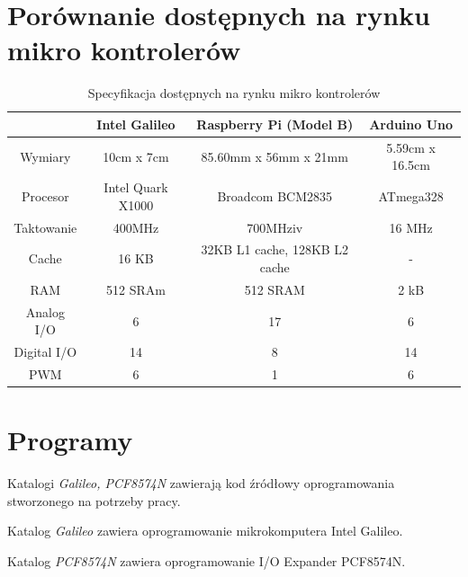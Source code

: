 \documentclass{xmgr}
\begin{document}
\chapter{Porównanie dostępnych na rynku mikro kontrolerów}
\begin{table}[!tbh]
\begin{tabular}{|c|c|c|c|} \hline
 & Intel Galileo & Raspberry Pi (Model B) & Arduino Uno \\ \hline
Wymiary & 10cm x 7cm  & 85.60mm x 56mm x 21mm & 5.59cm x 16.5cm \\ \hline
Procesor & Intel Quark X1000 & Broadcom BCM2835 & ATmega328 \\ \hline
Taktowanie &	400MHz	& 700MHziv & 16 MHz\\ \hline
Cache &	16 KB & 32KB L1 cache, 128KB L2 cache & - \\ \hline
RAM &	512 SRAm & 512 SRAM & 2 kB \\ \hline
Analog I/O	& 6 & 17 & 6 \\ \hline
Digital I/O	& 14 & 8 & 14 \\ \hline
PWM	& 6 & 1 & 6 \\ \hline
\end{tabular}
\caption{Specyfikacja dostępnych na rynku mikro kontrolerów}
\end{table}
\chapter{Programy}
Katalogi \emph{Galileo, PCF8574N} zawierają kod źródłowy oprogramowania stworzonego na potrzeby pracy. 

\noindent Katalog \emph{Galileo} zawiera oprogramowanie mikrokomputera Intel\cite{einstein} Galileo.

\noindent Katalog \emph{PCF8574N} zawiera oprogramowanie I/O Expander PCF8574N.




\listoftables

\listoffigures

\oswiadczenie
\end{document}
